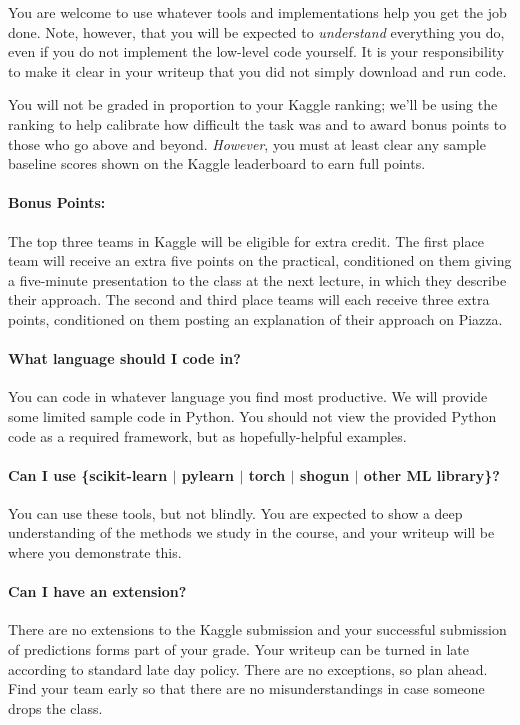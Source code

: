 \documentclass[12pt,letterpaper]{article}
\begin{document}
You are welcome to use whatever tools and implementations help you get
the job done.  Note, however, that you will be expected to
\emph{understand} everything you do, even if you do not implement the
low-level code yourself.  It is your responsibility to make it clear
in your writeup that you did not simply download and run code.


You will not be graded in proportion to your Kaggle ranking; we'll be using
the ranking to help calibrate how difficult the task was and to award
bonus points to those who go above and beyond.  \textit{However}, you
must at least clear any sample baseline scores shown on the Kaggle
leaderboard to earn full points.


\paragraph{Bonus Points:}
The top three teams in Kaggle will be eligible for extra credit.  The
first place team will receive an extra five points on the practical,
conditioned on them giving a five-minute presentation to the class at
the next lecture, in which they describe their approach.  The second
and third place teams will each receive three extra points,
conditioned on them posting an explanation of their approach on
Piazza.

\paragraph{What language should I code in?}
You can code in whatever language you find most productive.  We will
provide some limited sample code in Python.  You should not view the
provided Python code as a required framework, but as hopefully-helpful
examples.

\paragraph{Can I use \{scikit-learn $|$ pylearn $|$ torch $|$ shogun $|$ other ML library\}?}
You can use these tools, but not blindly.  You are expected to show a
deep understanding of the methods we study in the course, and your
writeup will be where you demonstrate this.

\paragraph{Can I have an extension?}
There are no extensions to the Kaggle submission and your successful
submission of predictions forms part of your grade.  Your writeup can
be turned in late according to standard late day policy.  There are no
exceptions, so plan ahead.  Find your team early so that there are no
misunderstandings in case someone drops the class.
\end{document}
